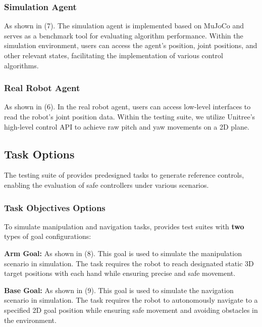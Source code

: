 \subsubsection{\textbf{Simulation Agent}}
As shown in  (7). The simulation agent is implemented based on MuJoCo and serves as a benchmark tool for evaluating algorithm performance. Within the simulation environment, users can access the agent's position, joint positions, and other relevant states, facilitating the implementation of various control algorithms.
\subsubsection{\textbf{Real Robot Agent}}
As shown in  (6). In the real robot agent, users can access low-level interfaces to read the robot's joint position data. Within the testing suite, we utilize Unitree's high-level control API to achieve raw pitch and yaw movements on a 2D plane.

\subsection{Task Options}  
The testing suite of \spark provides predesigned tasks to generate reference controls, enabling the evaluation of safe controllers under various scenarios.  
\subsubsection{Task Objectives Options}
To simulate manipulation and navigation tasks, \spark provides test suites with \textbf{two} types of goal configurations:



\textbf{Arm Goal:} 
As shown in  (8). This goal is used to simulate the manipulation scenario in simulation. The task requires the robot to reach designated static 3D target positions with each hand while ensuring precise and safe movement.

\textbf{Base Goal:}
As shown in  (9). This goal is used to simulate the navigation scenario in simulation. The task requires the robot to autonomously navigate to a specified 2D goal position while ensuring safe movement and avoiding obstacles in the environment.


